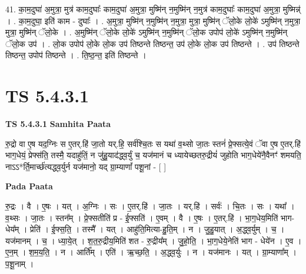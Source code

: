 \documentclass[17pt]{extarticle}
\begin{document}
41. का॒म॒दुघा॑ अ॒मुत्रा॒ मुत्र॑ काम॒दुघाः᳚ काम॒दुघा॑ अ॒मुत्रा॒ मुष्मि॑न् न॒मुष्मि॑न् न॒मुत्र॑ काम॒दुघाः᳚ काम॒दुघा॑ अ॒मुत्रा॒ मुष्मिन्न्॑ । . का॒म॒दुघा॒ इति॑ काम - दुघाः᳚ । . अ॒मुत्रा॒ मुष्मि॑न् न॒मुष्मि॑न् न॒मुत्रा॒ मुत्रा॒ मुष्मि॑न् ॅलो॒के लो॒के॑ ऽमुष्मि॑न् न॒मुत्रा॒ मुत्रा॒ मुष्मि॑न् ॅलो॒के । . अ॒मुष्मि॑न् ॅलो॒के लो॒के॑ ऽमुष्मि॑न् न॒मुष्मि॑न् ॅलो॒क उपोप॑ लो॒के॑ ऽमुष्मि॑न् न॒मुष्मि॑न् ॅलो॒क उप॑ । . लो॒क उपोप॑ लो॒के लो॒क उप॑ तिष्ठन्ते तिष्ठन्त॒ उप॑ लो॒के लो॒क उप॑ तिष्ठन्ते । . उप॑ तिष्ठन्ते तिष्ठन्त॒ उपोप॑ तिष्ठन्ते । . ति॒ष्ठ॒न्त॒ इति॑ तिष्ठन्ते । \newline
\pagebreak
{}

\section{ TS 5.4.3.1 }

\textbf{TS 5.4.3.1 } \newline
\textbf{Samhita Paata} \newline

रु॒द्रो वा ए॒ष यद॒ग्निः स ए॒तर्.हि॑ जा॒तो यर्.हि॒ सर्व॑श्चि॒तः स यथा॑ व॒थ्सो जा॒तः स्तनं॑ प्रे॒फ्सत्ये॒वं ॅवा ए॒ष ए॒तर्.हि॑ भाग॒धेयं॒ प्रेफ्स॑ति॒ तस्मै॒ यदाहु॑तिं॒ न जु॑हु॒याद॑द्ध्व॒र्युं च॒ यज॑मानं च ध्यायेच्छतरु॒द्रीयं॑ जुहोति भाग॒धेये॑नै॒वैनꣳ॑ शमयति॒ नाऽऽ*र्ति॒मार्च्छ॑त्यद्ध्व॒र्युर्न यज॑मानो॒ यद् ग्रा॒म्याणां᳚ पशू॒नां - [  ] \newline

\textbf{Pada Paata} \newline

रु॒द्रः । वै । ए॒षः । यत् । अ॒ग्निः । सः । ए॒तर्.हि॑ । जा॒तः । यर्.हि॑ । सर्वः॑ । चि॒तः । सः । यथा᳚ । व॒थ्सः । जा॒तः । स्तन᳚म् । प्रे॒फ्सतीति॑ प्र - ई॒फ्सति॑ । ए॒वम् । वै । ए॒षः । ए॒तर्.हि॑ । भा॒ग॒धेय॒मिति॑ भाग-धेय᳚म् । प्रेति॑ । ई॒फ्स॒ति॒ । तस्मै᳚ । यत् । आहु॑ति॒मित्या-हु॒ति॒म् । न । जु॒हु॒यात् । अ॒द्ध्व॒र्युम् । च॒ । यज॑मानम् । च॒ । ध्या॒ये॒त् । श॒त॒रु॒द्रीय॒मिति॑ शत - रु॒द्रीय᳚म् । जु॒हो॒ति॒ । भा॒ग॒धेये॒नेति॑ भाग - धेये॑न । ए॒व । ए॒न॒म् । श॒म॒य॒ति॒ । न । आर्ति᳚म् । एति॑ । ऋ॒च्छ॒ति॒ । अ॒द्ध्व॒र्युः । न । यज॑मानः । यत् । ग्रा॒म्याणा᳚म् । प॒शू॒नाम् ।  \newline
\end{document}
